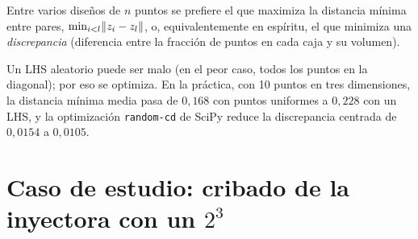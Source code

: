 \begin{definicion}\label{def:maximin}
Entre varios diseños de $n$ puntos se prefiere el que maximiza la distancia mínima entre pares, $\min_{i<l}\lVert z_i-z_l\rVert$, o, equivalentemente en espíritu, el que minimiza una \emph{discrepancia} (diferencia entre la fracción de puntos en cada caja y su volumen).
\end{definicion}

Un LHS aleatorio puede ser malo (en el peor caso, todos los puntos en la diagonal); por eso se optimiza. En la práctica, con 10 puntos en tres dimensiones, la distancia mínima media pasa de $0{,}168$ con puntos uniformes a $0{,}228$ con un LHS, y la optimización \texttt{random-cd} de SciPy reduce la discrepancia centrada de $0{,}0154$ a $0{,}0105$.

\section{Caso de estudio: cribado de la inyectora con un \texorpdfstring{$2^3$}{2\^{}3}}

